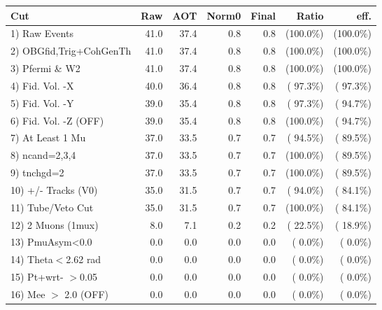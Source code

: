  \begin{table}[h!]\centering
 \begin{tabular}{||l||r|r|r|r|r|r||}
 \hline
 \hline
 Cut & Raw & AOT & Norm0 & Final & Ratio & eff.       \\
 \hline
  1) Raw Events           &         41.0 &         37.4 &          0.8 &          0.8 & (100.0\%) & (100.0\%) \\
  2) OBGfid,Trig+CohGenTh &         41.0 &         37.4 &          0.8 &          0.8 & (100.0\%) & (100.0\%) \\
  3) Pfermi \& W2         &         41.0 &         37.4 &          0.8 &          0.8 & (100.0\%) & (100.0\%) \\
  4) Fid. Vol. -X         &         40.0 &         36.4 &          0.8 &          0.8 & ( 97.3\%) & ( 97.3\%) \\
  5) Fid. Vol. -Y         &         39.0 &         35.4 &          0.8 &          0.8 & ( 97.3\%) & ( 94.7\%) \\
  6) Fid. Vol. -Z (OFF)   &         39.0 &         35.4 &          0.8 &          0.8 & (100.0\%) & ( 94.7\%) \\
  7) At Least 1 Mu        &         37.0 &         33.5 &          0.7 &          0.7 & ( 94.5\%) & ( 89.5\%) \\
  8) ncand=2,3,4          &         37.0 &         33.5 &          0.7 &          0.7 & (100.0\%) & ( 89.5\%) \\
  9) tnchgd=2             &         37.0 &         33.5 &          0.7 &          0.7 & (100.0\%) & ( 89.5\%) \\
 10) +/- Tracks (V0)      &         35.0 &         31.5 &          0.7 &          0.7 & ( 94.0\%) & ( 84.1\%) \\
 11) Tube/Veto Cut        &         35.0 &         31.5 &          0.7 &          0.7 & (100.0\%) & ( 84.1\%) \\
 12) 2 Muons (1mux)       &          8.0 &          7.1 &          0.2 &          0.2 & ( 22.5\%) & ( 18.9\%) \\
 13) PmuAsym<0.0          &          0.0 &          0.0 &          0.0 &          0.0 & (  0.0\%) & (  0.0\%) \\
 14) Theta$<$2.62 rad     &          0.0 &          0.0 &          0.0 &          0.0 & (  0.0\%) & (  0.0\%) \\
 15) Pt+wrt- $>$0.05      &          0.0 &          0.0 &          0.0 &          0.0 & (  0.0\%) & (  0.0\%) \\
 16) Mee $>$ 2.0  (OFF)   &          0.0 &          0.0 &          0.0 &          0.0 & (  0.0\%) & (  0.0\%) \\

\end{tabular}
\end{table}
